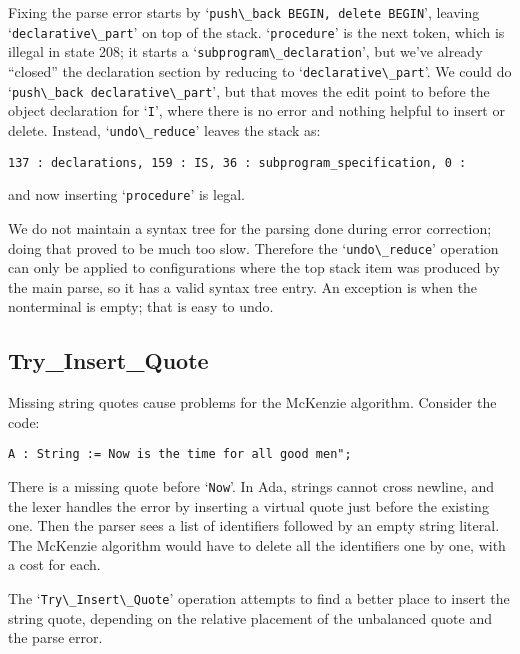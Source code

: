 \documentclass{article}
\newcommand{\code}[1]{`\lstinline|#1|'}
\begin{document}
Fixing the parse error starts by \code{push\_back BEGIN, delete BEGIN},
leaving \code{declarative\_part} on top of the stack. \code{procedure}
is the next token, which is illegal in state 208; it starts a
\code{subprogram\_declaration}, but we've already ``closed'' the
declaration section by reducing to \code{declarative\_part}. We could
do \code{push\_back declarative\_part}, but that moves the edit point to
before the object declaration for \code{I}, where there is no error
and nothing helpful to insert or delete. Instead, \code{undo\_reduce}
leaves the stack as:

\begin{verbatim}
137 : declarations, 159 : IS, 36 : subprogram_specification, 0 :
\end{verbatim}
and now inserting \code{procedure} is legal.

We do not maintain a syntax tree for the parsing done during error
correction; doing that proved to be much too slow. Therefore the
\code{undo\_reduce} operation can only be applied to configurations
where the top stack item was produced by the main parse, so it has a
valid syntax tree entry. An exception is when the nonterminal is
empty; that is easy to undo.

\subsection{Try\_Insert\_Quote}
Missing string quotes cause problems for the McKenzie algorithm.
Consider the code:
\begin{lstlisting}
A : String := Now is the time for all good men";
\end{lstlisting}
There is a missing quote before \code{Now}. In Ada, strings cannot
cross newline, and the lexer handles the error by inserting a virtual
quote just before the existing one. Then the parser sees a list of
identifiers followed by an empty string literal. The McKenzie
algorithm would have to delete all the identifiers one by one, with a
cost for each.

The \code{Try\_Insert\_Quote} operation attempts to find a better
place to insert the string quote, depending on the relative placement
of the unbalanced quote and the parse error.
\end{document}
